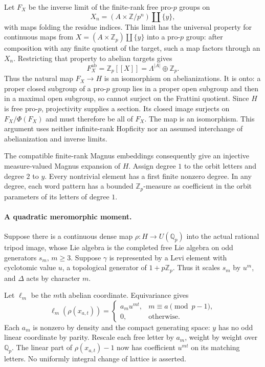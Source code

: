 Let $F_X$ be the inverse limit of the finite-rank free pro-$p$ groups on
\[
 X_n=(A\times\mathbb Z/p^n)\amalg\{y\},
\]
with maps folding the residue indices. This limit has the universal property for continuous maps from $X=(A\times\mathbb Z_p)\amalg\{y\}$ into a pro-$p$ group: after composition with any finite quotient of the target, such a map factors through an $X_n$. Restricting that property to abelian targets gives
\[
 F_X^{\mathrm{ab}}=\mathbb Z_p[[X]]=
 \Lambda^{|A|}\oplus\mathbb Z_p.
\]
Thus the natural map $F_X\to H$ is an isomorphism on abelianizations. It is onto: a proper closed subgroup of a pro-$p$ group lies in a proper open subgroup and then in a maximal open subgroup, so cannot surject on the Frattini quotient. Since $H$ is free pro-$p$, projectivity supplies a section. Its closed image surjects on $F_X/\Phi(F_X)$ and must therefore be all of $F_X$. The map is an isomorphism. This argument uses neither infinite-rank Hopficity nor an assumed interchange of abelianization and inverse limits.

The compatible finite-rank Magnus embeddings consequently give an injective measure-valued Magnus expansion of $H$. Assign degree $1$ to the orbit letters and degree $2$ to $y$. Every nontrivial element has a first finite nonzero degree. In any degree, each word pattern has a bounded $\mathbb Z_p$-measure as coefficient in the orbit parameters of its letters of degree $1$.

\paragraph{A quadratic meromorphic moment.}
Suppose there is a continuous dense map $\rho:H\to U(\mathbb Q_p)$ into the actual rational tripod image, whose Lie algebra is the completed free Lie algebra on odd generators $s_m$, $m\ge3$. Suppose $\gamma$ is represented by a Levi element with cyclotomic value $u$, a topological generator of $1+p\mathbb Z_p$. Thus it scales $s_m$ by $u^m$, and $\Delta$ acts by character $m$.

Let $\ell_m$ be the $m$th abelian coordinate. Equivariance gives
\[
 \ell_m(\rho(x_{a,t}))=
 \begin{cases}a_m u^{mt},&m\equiv a\pmod{p-1},\\0,&\text{otherwise}.
 \end{cases}
\]
Each $a_m$ is nonzero by density and the compact generating space: $y$ has no odd linear coordinate by parity. Rescale each free letter by $a_m$, weight by weight over $\mathbb Q_p$. The linear part of $\rho(x_{a,t})-1$ now has coefficient $u^{mt}$ on its matching letters. No uniformly integral change of lattice is asserted.

